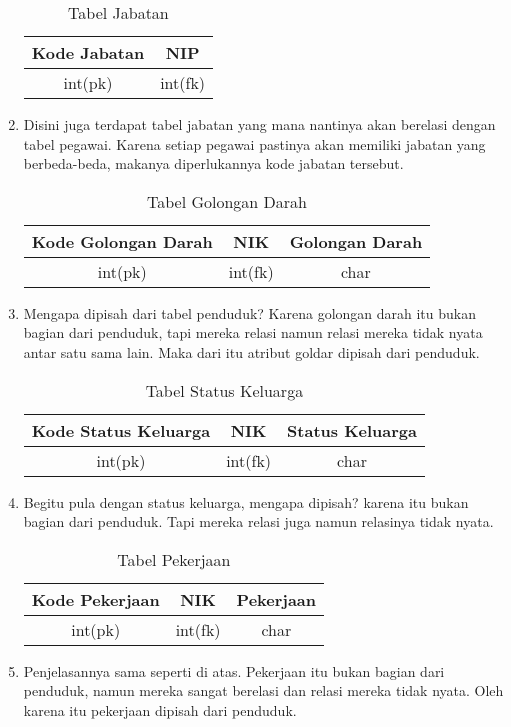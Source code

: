 \documentclass{article}
\begin{document}
\begin{enumerate}
\newpage
\begin{table}[h]
\begin{center}
\begin{tabular}{|c|c|}
\hline
Kode Jabatan & NIP\\
\hline
int(pk) & int(fk)\\
\hline
\end{tabular}
\caption{Tabel Jabatan}
\end{center}
\end{table}
\item Disini juga terdapat tabel jabatan yang mana nantinya akan berelasi dengan tabel pegawai. Karena setiap pegawai pastinya akan memiliki jabatan yang berbeda-beda, makanya diperlukannya kode jabatan tersebut.

\begin{table}[h]
\begin{center}
\begin{tabular}{|c|c|c|}
\hline
Kode Golongan Darah & NIK & Golongan Darah\\
\hline
int(pk) & int(fk) & char\\
\hline
\end{tabular}
\caption{Tabel Golongan Darah}
\end{center}
\end{table}
\item Mengapa dipisah dari tabel penduduk? Karena golongan darah itu bukan bagian dari penduduk, tapi mereka relasi namun relasi mereka tidak nyata antar satu sama lain. Maka dari itu atribut goldar dipisah dari penduduk.

\begin{table}[h]
\begin{center}
\begin{tabular}{|c|c|c|}
\hline
Kode Status Keluarga & NIK & Status Keluarga\\
\hline
int(pk) & int(fk) & char\\
\hline
\end{tabular}
\caption{Tabel Status Keluarga}
\end{center}
\end{table}
\item Begitu pula dengan status keluarga, mengapa dipisah? karena itu bukan bagian dari penduduk. Tapi mereka relasi juga namun relasinya tidak nyata.

\newpage
\begin{table}[h]
\begin{center}
\begin{tabular}{|c|c|c|}
\hline
Kode Pekerjaan & NIK & Pekerjaan\\
\hline
int(pk) & int(fk) & char\\
\hline
\end{tabular}
\caption{Tabel Pekerjaan}
\end{center}
\end{table}
\item Penjelasannya sama seperti di atas. Pekerjaan itu bukan bagian dari penduduk, namun mereka sangat berelasi dan relasi mereka tidak nyata. Oleh karena itu pekerjaan dipisah dari penduduk.


\end{enumerate}
\end{document}
